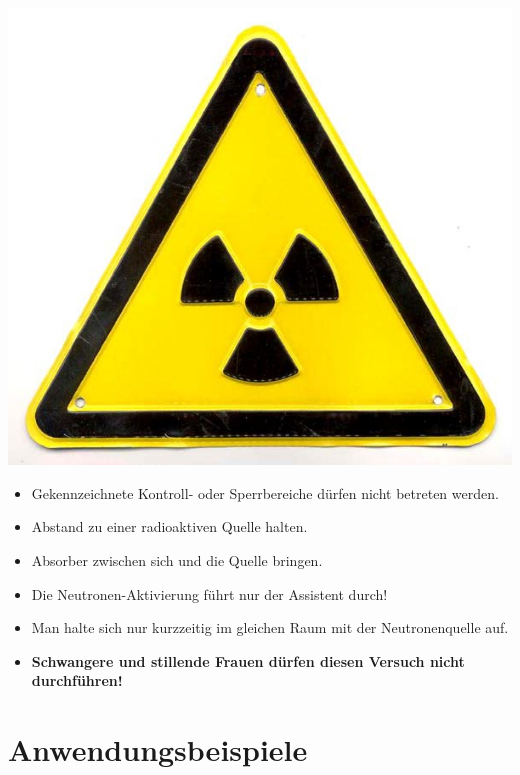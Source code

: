 \begin{minipage}{0.4\textwidth}
	\includegraphics[width=\textwidth]{Abbildungen/Schild.jpg}
	\label{fig:Schild}
\end{minipage}
%
\begin{minipage}{0.6\textwidth}
	\begin{itemize}
		\item Gekennzeichnete Kontroll- oder Sperrbereiche dürfen nicht betreten werden.
		\item Abstand zu einer radioaktiven Quelle halten.
		\item Absorber zwischen sich und die Quelle bringen.
		\item Die Neutronen-Aktivierung führt nur der Assistent durch!
		\item Man halte sich nur kurzzeitig im gleichen Raum mit der Neutronenquelle auf.
		\item \textbf{Schwangere und stillende Frauen dürfen diesen Versuch nicht durchführen!}
	\end{itemize}
\end{minipage}

\section{Anwendungsbeispiele}

